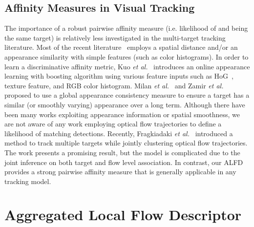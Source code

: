 \documentclass[10pt,twocolumn,letterpaper]{article}
\begin{document}
\subsection{Affinity Measures in Visual Tracking}
The importance of a robust pairwise affinity measure (i.e. likelihood of  and  being the same target) is relatively less investigated in the multi-target tracking literature. Most of the recent literature~\cite{Andriyenko:2012:DCO,BerclazFTF11,Pirsiavash_CVPR_11,ZamirECCV12} employs a spatial distance and/or an appearance similarity with simple features (such as color histograms). In order to learn a discriminative affinity metric, Kuo \emph{et al.}~\cite{Kuo_CVPR_10} introduces an online appearance learning with boosting algorithm using various feature inputs such as HoG~\cite{dalal2005histograms}, texture feature, and RGB color histogram. Milan \emph{et al.}~\cite{Milan:2014:CEM} and Zamir \emph{et al.}~\cite{ZamirECCV12} proposed to use a global appearance consistency measure to ensure a target has a similar (or smoothly varying) appearance over a long term. Although there have been many works exploiting appearance information or spatial smoothness, we are not aware of any work employing optical flow trajectories to define a likelihood of matching detections. Recently, Fragkiadaki \emph{et al.}~\cite{FragkiadakiZZS12} introduced a method to track multiple targets while jointly clustering optical flow trajectories. The work presents a promising result, but the model is complicated due to the joint inference on both target and flow level association. In contrast, our ALFD provides a strong pairwise affinity measure that is generally applicable in any tracking model.

\section{Aggregated Local Flow Descriptor}
\label{sec:ALFD}
\end{document}
